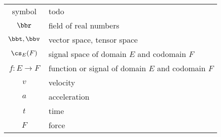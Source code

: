 \begin{tabular}{cp{}}
  symbol & todo\\
  $\bbr$ & field of real numbers\\
  $\bbt, \bbv$ & vector space, tensor space\\
  $\cs_E(F)$ & signal space of domain $E$ and codomain $F$\\
  $f: E \to F$ & function or signal of domain $E$ and codomain $F$\\
  


  $v$ & velocity \\
  $a$ & acceleration \\
  $t$ & time \\
  $F$ & force
\end{tabular}\\